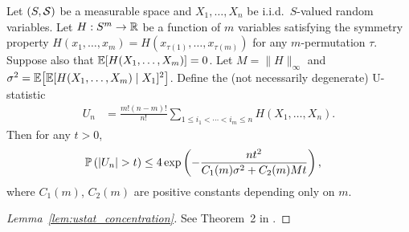 \begin{lemma}
  \label{lem:ustat_concentration}

  Let $(S,\cS)$ be a measurable space and
  $X_1, \ldots, X_n$ be i.i.d.\ $S$-valued random variables.
  Let $H: S^m \to \R$ be a function of $m$ variables
  satisfying the symmetry property
  $H(x_1, \ldots, x_m) = H(x_{\tau (1)}, \ldots, x_{\tau (m)})$
  for any $m$-permutation $\tau$.
  Suppose also that
  $\E[H(X_1, \ldots, X_m)] = 0$.
  Let
  $M = \|H\|_\infty$
  and
  $\sigma^2 = \E\big[\E[H(X_1, \ldots, X_m) \mid X_1]^2\big]$.
  Define the (not necessarily degenerate)
  U-statistic
  \begin{align*}
    U_n
    &=
    \frac{m!(n-m)!}{n!}
    \sum_{1 \leq i_1 < \cdots < i_m \leq n}
    H(X_1, \ldots, X_n).
  \end{align*}
  Then for any $t > 0$,
  \begin{align*}
    \P\left(
      |U_n| > t
    \right)
    &\leq
    4 \exp \left(
      - \frac{n t^2}{C_1(m) \sigma^2 + C_2(m) M t}
    \right),
  \end{align*}
  where $C_1(m)$, $C_2(m)$
  are positive constants depending only on $m$.

\end{lemma}

\begin{proof}[Lemma~\ref{lem:ustat_concentration}]

  See Theorem~2 in \citet{arcones1995bernstein}.
\end{proof}

